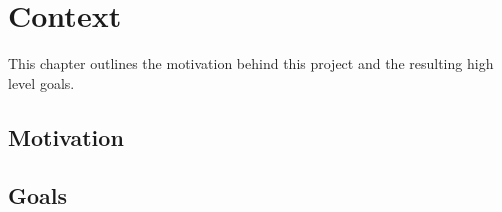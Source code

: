 \chapter{Context}
  This chapter outlines the motivation behind this project and the resulting high level goals.

  \section{Motivation}
  \section{Goals}
